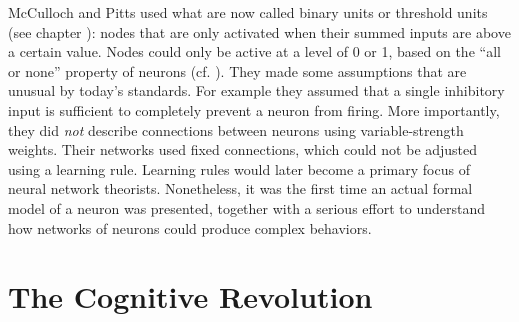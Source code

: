 McCulloch and Pitts used what are now called binary units or threshold units (see chapter ): nodes that are only activated when their summed inputs are above a certain value. Nodes could only be active at a level of 0 or 1, based on the ``all or none'' property of neurons (cf. ). They made some assumptions that are unusual by today's standards. For example they assumed that a single inhibitory input is sufficient to completely prevent a neuron from firing. More importantly, they did \emph{not} describe connections between neurons using variable-strength weights. Their networks used fixed connections, which could not be adjusted using a learning rule. Learning rules would later become a  primary focus of neural network theorists. Nonetheless, it was the first time an actual formal model of a neuron was presented, together with a serious effort to understand how networks of neurons could produce complex behaviors.


\section{The Cognitive Revolution}\label{cog_rev}

